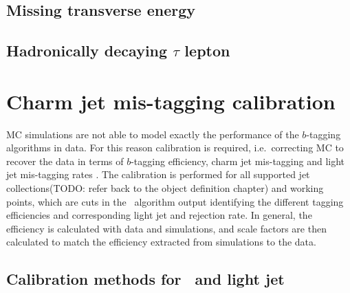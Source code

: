 \documentclass[letterpaper,12pt]{article}
\begin{document}





\subsection{Missing transverse energy}
\subsection{Hadronically decaying $\tau$ lepton}


\section{Charm jet mis-tagging calibration}
MC simulations are not able to model exactly the 
performance of the $b$-tagging algorithms in data. For this reason 
calibration is required, i.e.\ correcting MC to recover the data 
in terms of $b$-tagging efficiency, charm jet mis-tagging and 
light jet mis-tagging rates \cite{FTAG-2018-01}. The calibration is performed 
for all supported jet collections(TODO: refer back to the object definition chapter)
and working points, which are cuts in the \btagging\ 
algorithm output identifying the different tagging efficiencies 
and corresponding light jet and \cjet rejection rate.
In general, the efficiency is calculated with data and simulations, 
and scale factors are then calculated to match the efficiency extracted 
from simulations to the data.
\subsection{Calibration methods for \bjet\ and light jet}
\end{document}
